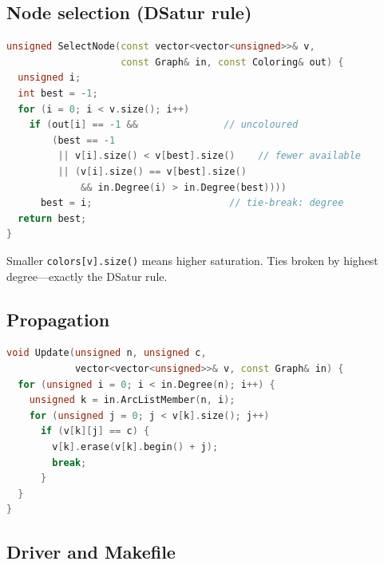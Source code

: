 \subsection{Node selection (DSatur rule)}
\label{ssec:gc-select-node}

\begin{lstlisting}[language=C++,
  caption={\texttt{SelectNode}: pick the most saturated
           uncoloured vertex.},
  label={lst:gc-select}]
unsigned SelectNode(const vector<vector<unsigned>>& v,
                    const Graph& in, const Coloring& out) {
  unsigned i;
  int best = -1;
  for (i = 0; i < v.size(); i++)
    if (out[i] == -1 &&               // uncoloured
        (best == -1
         || v[i].size() < v[best].size()    // fewer available
         || (v[i].size() == v[best].size()
             && in.Degree(i) > in.Degree(best))))
      best = i;                        // tie-break: degree
  return best;
}
\end{lstlisting}

\noindent
Smaller \texttt{colors[v].size()} means higher saturation.
Ties broken by highest degree---exactly the DSatur rule.

\subsection{Propagation}
\label{ssec:gc-update}

\begin{lstlisting}[language=C++,
  caption={\texttt{Update}: remove colour \texttt{c} from
           all neighbours of~\texttt{n}.},
  label={lst:gc-update}]
void Update(unsigned n, unsigned c,
            vector<vector<unsigned>>& v, const Graph& in) {
  for (unsigned i = 0; i < in.Degree(n); i++) {
    unsigned k = in.ArcListMember(n, i);
    for (unsigned j = 0; j < v[k].size(); j++)
      if (v[k][j] == c) {
        v[k].erase(v[k].begin() + j);
        break;
      }
  }
}
\end{lstlisting}

\subsection{Driver and Makefile}
\label{ssec:gc-driver}

